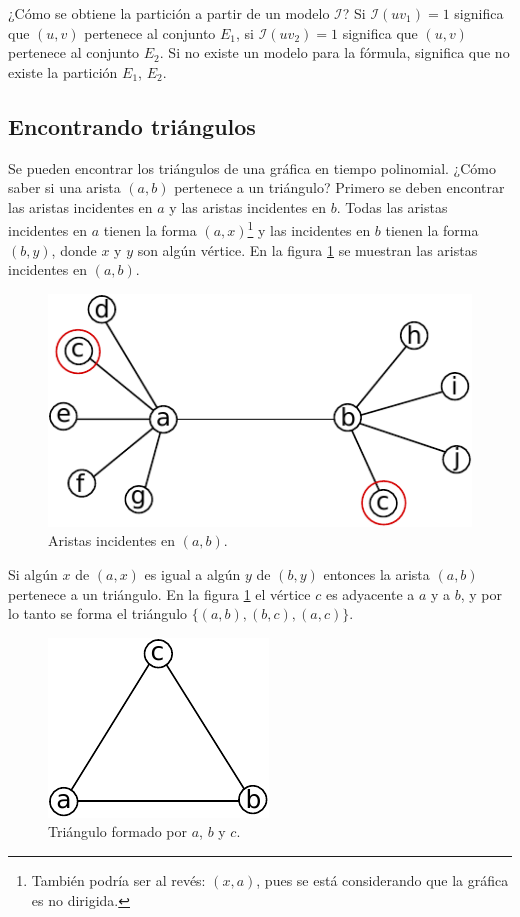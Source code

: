 \documentclass{article}
\begin{document}
¿Cómo se obtiene la partición a partir de un modelo $\mathcal{I}$? Si $\mathcal{I} (uv_1) = 1$ significa que $(u,v)$ pertenece al conjunto $E_1$, si $\mathcal{I} (uv_2) = 1$ significa que $(u,v)$ pertenece al conjunto $E_2$. Si no existe un modelo para la fórmula, significa que no existe la partición $E_1$, $E_2$.

\subsection*{Encontrando triángulos}

Se pueden encontrar los triángulos de una gráfica en tiempo polinomial. ¿Cómo saber si una arista $(a,b)$ pertenece a un triángulo? Primero se deben encontrar las aristas incidentes en $a$ y las aristas incidentes en $b$. Todas las aristas incidentes en $a$ tienen la forma $(a,x)$\footnote{También podría ser al revés: $(x,a)$, pues se está considerando que la gráfica es no dirigida.} y las incidentes en $b$ tienen la forma $(b,y)$, donde $x$ y $y$ son algún vértice. En la figura \ref{incidencia} se muestran las aristas incidentes en $(a,b)$.

\begin{figure}[htbp]
\begin{center}
\includegraphics[scale=1]{incidentes}
\caption{Aristas incidentes en $(a,b)$.}
\label{incidencia}
\end{center}
\end{figure}

Si algún $x$ de $(a,x)$ es igual a algún $y$ de $(b,y)$ entonces la arista $(a,b)$ pertenece a un triángulo. En la figura \ref{incidencia} el vértice $c$ es adyacente a $a$ y a $b$, y por lo tanto se forma el triángulo $\{ (a,b), (b,c), (a,c) \}$.

\begin{figure}[htbp]
\begin{center}
\includegraphics[scale=1]{triangulo}
\caption{Triángulo formado por $a$, $b$ y $c$.}
\label{triangulo}
\end{center}
\end{figure}
\end{document}
